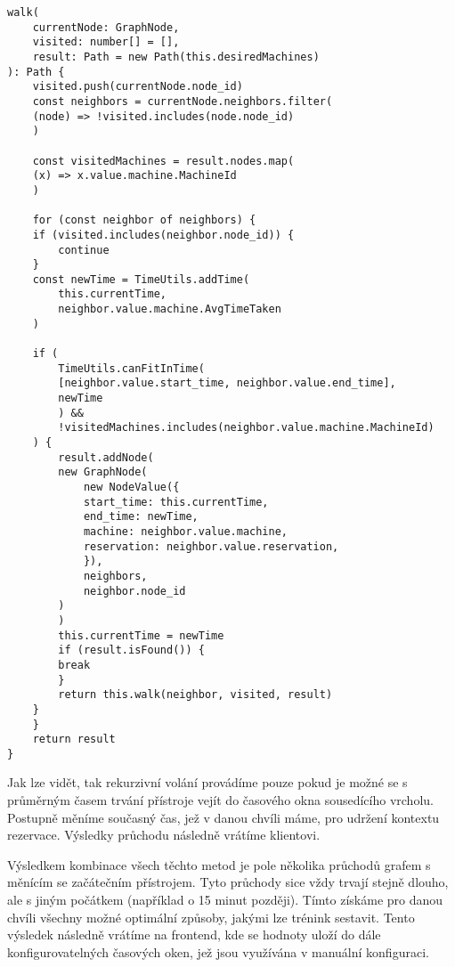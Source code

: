 \begin{lstlisting}
walk(
    currentNode: GraphNode,
    visited: number[] = [],
    result: Path = new Path(this.desiredMachines)
): Path {
    visited.push(currentNode.node_id)
    const neighbors = currentNode.neighbors.filter(
	(node) => !visited.includes(node.node_id)
    )

    const visitedMachines = result.nodes.map(
	(x) => x.value.machine.MachineId
    )

    for (const neighbor of neighbors) {
	if (visited.includes(neighbor.node_id)) {
	    continue
	}
	const newTime = TimeUtils.addTime(
	    this.currentTime,
	    neighbor.value.machine.AvgTimeTaken
	)

	if (
	    TimeUtils.canFitInTime(
		[neighbor.value.start_time, neighbor.value.end_time],
		newTime
	    ) &&
	    !visitedMachines.includes(neighbor.value.machine.MachineId)
	) {
	    result.addNode(
		new GraphNode(
		    new NodeValue({
			start_time: this.currentTime,
			end_time: newTime,
			machine: neighbor.value.machine,
			reservation: neighbor.value.reservation,
		    }),
		    neighbors,
		    neighbor.node_id
		)
	    )
	    this.currentTime = newTime
	    if (result.isFound()) {
		break
	    }
	    return this.walk(neighbor, visited, result)
	}
    }
    return result
}
\end{lstlisting}

Jak lze vidět, tak rekurzivní volání provádíme pouze pokud je možné se s průměrným časem trvání přístroje vejít do časového okna sousedícího vrcholu. Postupně měníme současný čas, jež v danou chvíli máme, pro udržení kontextu rezervace. Výsledky průchodu následně vrátíme klientovi.

Výsledkem kombinace všech těchto metod je pole několika průchodů grafem s měnícím se začátečním přístrojem. Tyto průchody sice vždy trvají stejně dlouho, ale s jiným počátkem (například o 15 minut později). Tímto získáme pro danou chvíli všechny možné optimální způsoby, jakými lze trénink sestavit. Tento výsledek následně vrátíme na frontend, kde se hodnoty uloží do dále konfigurovatelných časových oken, jež jsou využívána v manuální konfiguraci.
